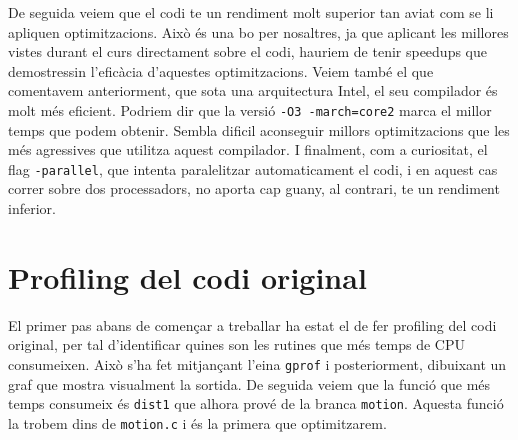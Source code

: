 De seguida veiem que el codi te un rendiment molt superior tan aviat com se li apliquen optimitzacions. Això és una bo per nosaltres, ja que aplicant les millores vistes durant el curs directament sobre el codi, hauriem de tenir speedups que demostressin l'eficàcia d'aquestes optimitzacions.
Veiem també el que comentavem anteriorment, que sota una arquitectura Intel, el seu compilador és molt més eficient. Podriem dir que la versió \texttt{-O3 -march=core2} marca el millor temps que podem obtenir. Sembla dificil aconseguir millors optimitzacions que les més agressives que utilitza aquest compilador.
I finalment, com a curiositat, el flag \texttt{-parallel}, que intenta paralelitzar automaticament el codi, i en aquest cas correr sobre dos processadors, no aporta cap guany, al contrari, te un rendiment inferior.

\section{Profiling del codi original}

El primer pas abans de començar a treballar ha estat el de fer profiling del codi original, per tal d'identificar quines son les rutines que més temps de CPU consumeixen. Això s'ha fet mitjançant l'eina \texttt{gprof} i posteriorment, dibuixant un graf que mostra visualment la sortida. De seguida veiem que la funció que més temps consumeix és \texttt{dist1} que alhora prové de la branca \texttt{motion}. Aquesta funció la trobem dins de \texttt{motion.c} i és la primera que optimitzarem.

